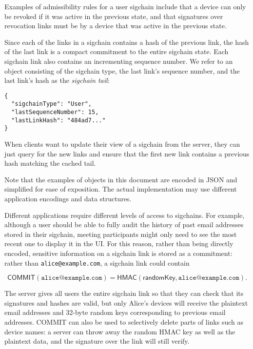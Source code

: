 Examples of admissibility rules for a user sigchain include that a device can only be revoked if it
was active in the previous state, and that signatures over revocation links must be by a device that
was active in the previous state.

Since each of the links in a sigchain contains a hash of the previous link, the hash of the last
link is a compact commitment to the entire sigchain state. Each sigchain link
also contains an incrementing sequence number. We refer to an object consisting of the sigchain type, the
last link’s sequence number, and the last link's hash as the \textit{sigchain tail}:

\begingroup{}
\fontsize{10pt}{12pt}\selectfont{}
\begin{verbatim}
{
  "sigchainType": "User",
  "lastSequenceNumber": 15,
  "lastLinkHash": "484ad7..."
}
\end{verbatim}
\endgroup{}

When clients want to update their view of a sigchain from the server, they can just query for the
new links and ensure that the first new link contains a previous hash matching the cached tail.

Note that the examples of objects in this document are encoded in JSON and simplified for
ease of exposition. The actual implementation may use different application
encodings and data structures.

Different applications require different levels of access to sigchains. For example, although a user
should be able to fully audit the history of past email addresses stored in their sigchain, meeting
participants might only need to see the most recent one to display it in the UI\@. For this reason,
rather than being directly encoded, sensitive information on a sigchain link is stored as a
commitment: rather than \texttt{alice@example.com}, a sigchain link could contain

$$\mathsf{COMMIT}(\texttt{alice@example.com}) =
    \mathsf{HMAC}(\mathsf{randomKey}, \texttt{alice@example.com}).$$

The server gives all users the entire sigchain link so that they can check that its signatures and
hashes are valid, but only Alice’s devices will receive the plaintext email addresses and 32-byte
random keys corresponding to previous email addresses. \textsf{COMMIT} can also be used to
selectively delete parts of links such as device names: a server can throw away the random HMAC key
as well as the plaintext data, and the signature over the link will still verify.

